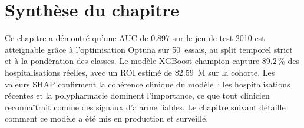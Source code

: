 \section*{Synthèse du chapitre}

Ce chapitre a démontré qu'une AUC de 0.897 sur le jeu de test 2010 est atteignable
grâce à l'optimisation Optuna sur 50~essais, au split temporel strict et à la
pondération des classes. Le modèle XGBoost champion capture 89.2\,\% des
hospitalisations réelles, avec un ROI estimé de \$2.59~M sur la cohorte. Les
valeurs SHAP confirment la cohérence clinique du modèle~: les hospitalisations
récentes et la polypharmacie dominent l'importance, ce que tout clinicien
reconnaîtrait comme des signaux d'alarme fiables. Le chapitre suivant détaille
comment ce modèle a été mis en production et surveillé.

